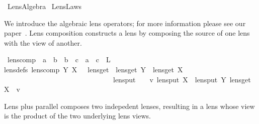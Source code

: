%
\begin{isabellebody}%
%
%
\isamarkuptrue%
%
\isadelimtheory
%
\endisadelimtheory
%
\isatagtheory
{}\isamarkupfalse%
\ Lens{\isacharunderscore}Algebra\isanewline
{}\ Lens{\isacharunderscore}Laws\isanewline
{}%
\endisatagtheory
{\isafoldtheory}%
%
\isadelimtheory
%
\endisadelimtheory
%
\isamarkuptrue%
%
\begin{isamarkuptext}%
We introduce the algebraic lens operators; for more information please see our paper~\cite{Foster16a}.
      Lens composition constructs a lens by composing the source of one lens with the view of another.%
\end{isamarkuptext}\isamarkuptrue%
\isamarkupfalse%
\ lens{\isacharunderscore}comp\ {\isacharcolon}{\isacharcolon}\ {\isachardoublequoteopen}{\isacharparenleft}{\isacharprime}a\ {\isasymLongrightarrow}\ {\isacharprime}b{\isacharparenright}\ {\isasymRightarrow}\ {\isacharparenleft}{\isacharprime}b\ {\isasymLongrightarrow}\ {\isacharprime}c{\isacharparenright}\ {\isasymRightarrow}\ {\isacharparenleft}{\isacharprime}a\ {\isasymLongrightarrow}\ {\isacharprime}c{\isacharparenright}{\isachardoublequoteclose}\ {\isacharparenleft}\ {\isachardoublequoteopen}{\isacharsemicolon}\isactrlsub L{\isachardoublequoteclose}\ {}{}{\isacharparenright}\ \isanewline
{\isacharbrackleft}lens{\isacharunderscore}defs{\isacharbrackright}{\isacharcolon}\ {\isachardoublequoteopen}lens{\isacharunderscore}comp\ Y\ X\ {\isacharequal}\ {\isasymlparr}\ lens{\isacharunderscore}get\ {\isacharequal}\ lens{\isacharunderscore}get\ Y\ {\isasymcirc}\ lens{\isacharunderscore}get\ X\isanewline
\ \ \ \ \ \ \ \ \ \ \ \ \ \ \ \ \ \ \ \ \ \ \ \ \ \ \ \ \ \ {\isacharcomma}\ lens{\isacharunderscore}put\ {\isacharequal}\ {\isacharparenleft}{\isasymlambda}\ {\isasymsigma}\ v{\isachardot}\ lens{\isacharunderscore}put\ X\ {\isasymsigma}\ {\isacharparenleft}lens{\isacharunderscore}put\ Y\ {\isacharparenleft}lens{\isacharunderscore}get\ X\ {\isasymsigma}{\isacharparenright}\ v{\isacharparenright}{\isacharparenright}\ {\isasymrparr}{\isachardoublequoteclose}%
\begin{isamarkuptext}%
Lens plus parallel composes two indepedent lenses, resulting in a lens whose view is the 
  product of the two underlying lens views.%
\end{isamarkuptext}\isamarkuptrue%

\end{isabellebody}
